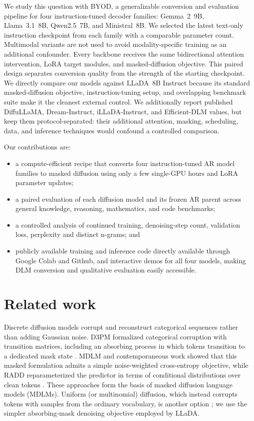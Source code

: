 \documentclass{article}
\newcommand{\method}{BYOD}
\begin{document}
We study this question with \method{}, a generalizable conversion and evaluation pipeline for four instruction-tuned decoder families: Gemma~2~9B, Llama~3.1~8B, Qwen2.5~7B, and Ministral~8B. We selected the latest text-only instruction checkpoint from each family with a comparable parameter count. Multimodal variants are not used to avoid modality-specific training as an additional confounder. Every backbone receives the same bidirectional attention intervention, LoRA target modules, and masked-diffusion objective. This paired design separates conversion quality from the strength of the starting checkpoint. We directly compare our models against LLaDA~8B Instruct because its standard masked-diffusion objective, instruction-tuning setup, and overlapping benchmark suite make it the cleanest external control. We additionally report published DiffuLLaMA, Dream-Instruct, iLLaDA-Instruct, and Efficient-DLM values, but keep them protocol-separated: their additional attention, masking, scheduling, data, and inference techniques would confound a controlled comparison.

Our contributions are:
\begin{itemize}
    \item a compute-efficient recipe that converts four instruction-tuned AR model families to masked diffusion using only a few single-GPU hours and LoRA parameter updates;
    \item a paired evaluation of each diffusion model and its frozen AR parent across general knowledge, reasoning, mathematics, and code benchmarks;
    \item a controlled analysis of continued training, denoising-step count, validation loss, perplexity and distinct n-grams; and
    \item publicly available training and inference code directly available through Google Colab and Github, and interactive demos for all four models, making DLM conversion and qualitative evaluation easily accessible.
\end{itemize}

\section{Related work}

Discrete diffusion models corrupt and reconstruct categorical sequences rather than adding Gaussian noise. D3PM formalized categorical corruption with transition matrices, including an absorbing process in which tokens transition to a dedicated mask state \citep{austin2021structured}. MDLM and contemporaneous work showed that this masked formulation admits a simple noise-weighted cross-entropy objective, while RADD reparameterized the predictor in terms of conditional distributions over clean tokens \citep{sahoo2024simple,shi2024simplified,ou2024absorbing}. These approaches form the basis of masked diffusion language models (MDLMs). Uniform (or multinomial) diffusion, which instead corrupts tokens with samples from the ordinary vocabulary, is another option \citep{hoogeboom2021multinomial}; we use the simpler absorbing-mask denoising objective employed by LLaDA.
\end{document}
